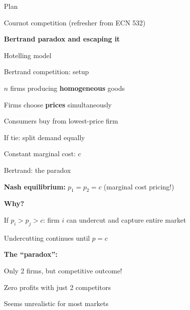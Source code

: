\documentclass[notes,11pt, aspectratio=169]{beamer}
\newenvironment{wideitemize}{\itemize\addtolength{\itemsep}{10pt}}{\enditemize}
\newenvironment{wideenumerate}{\enumerate\addtolength{\itemsep}{10pt}}{\endenumerate}
\begin{document}
\begin{frame}{Plan}
  \begin{wideenumerate}
    \item Cournot competition (refresher from ECN 532)
    \item \textbf{Bertrand paradox and escaping it}
    \item Hotelling model
  \end{wideenumerate}
\end{frame}


\begin{frame}{Bertrand competition: setup}
	\begin{wideitemize}
		\item $n$ firms producing \textbf{homogeneous} goods
		\item Firms choose \textbf{prices} simultaneously
		\item Consumers buy from lowest-price firm
		\item If tie: split demand equally
		\item Constant marginal cost: $c$
	\end{wideitemize}
\end{frame}

\begin{frame}{Bertrand: the paradox}
	\begin{wideitemize}
		\item \textbf{Nash equilibrium:} $p_1 = p_2 = c$ (marginal cost pricing!)
		\item \textbf{Why?}
		\begin{wideitemize}
			\vspace{5pt}
			\item If $p_i > p_j > c$: firm $i$ can undercut and capture entire market
			\item Undercutting continues until $p = c$
		\end{wideitemize}
		\item \textbf{The ``paradox'':}
		\begin{wideitemize}
			\vspace{5pt}
			\item Only 2 firms, but competitive outcome!
			\item Zero profits with just 2 competitors
			\item Seems unrealistic for most markets
		\end{wideitemize}
	\end{wideitemize}
\end{frame}
\end{document}
